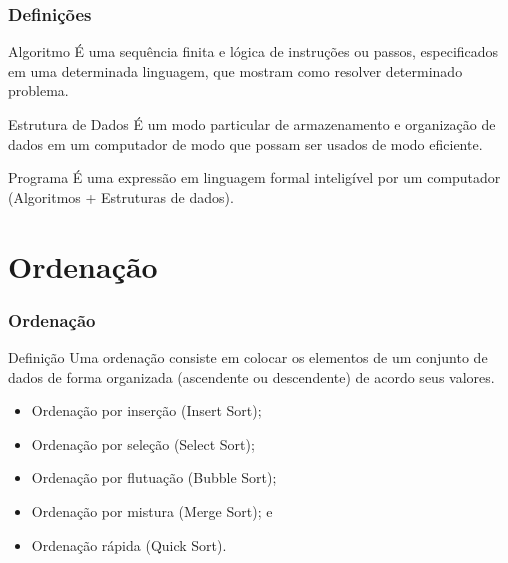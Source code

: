 \documentclass{beamer}
\begin{document}
\begin{frame}
\frametitle{Definições}

\begin{block}{Algoritmo}
É uma sequência finita e lógica de instruções ou passos, especificados em
uma determinada linguagem, que mostram como resolver determinado
problema.
\end{block}	\vfill

\begin{block}{Estrutura de Dados}
É um modo particular de armazenamento e organização de dados em um
computador de modo que possam ser usados de modo eficiente.
\end{block}	\vfill

\begin{block}{Programa}
É uma expressão em linguagem formal inteligível por um computador
(Algoritmos + Estruturas de dados).
\end{block}	
\end{frame}

\section{Ordenação}

\begin{frame}
\frametitle{Ordenação}

\begin{block}{Definição}
Uma ordenação consiste em colocar os elementos de um conjunto de dados
de forma organizada (ascendente ou descendente) de acordo seus valores.
\end{block}\vfill

\begin{itemize}
	\item Ordenação por inserção (Insert Sort);
	\item Ordenação por seleção (Select Sort);
	\item Ordenação por flutuação (Bubble Sort);
	\item Ordenação por mistura (Merge Sort); e
	\item Ordenação rápida (Quick Sort).
\end{itemize}

\end{frame}
\end{document}
